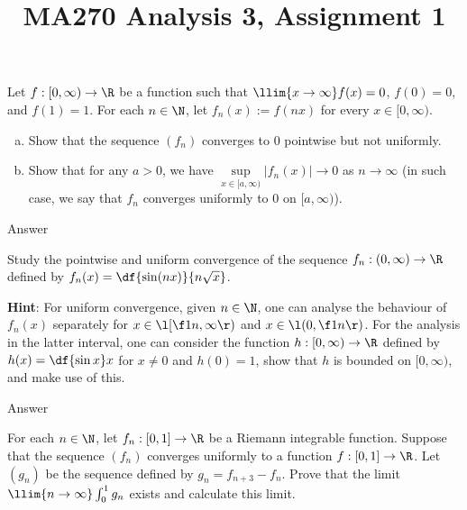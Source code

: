 \documentclass[a4paper]{article}
\title{MA270 Analysis 3, Assignment 1}
\begin{document}
\maketitle

\setlength{\parindent}{0em}
\setlength{\parskip}{1em}


\begin{questionbody}
Let $f : [0, \infty) \to \R$ be a function such that $\llim{x \to \infty} f(x) = 0$, $f(0) = 0$, and $f(1) = 1$. For each $n \in \N$, let $f_n(x) := f(nx)$ for every $x \in [0, \infty)$. %
\begin{enumerate}[(a)]
    \item Show that the sequence $(f_n)$ converges to 0 pointwise but not uniformly.
    \item Show that for any $a > 0$, we have $\sup\limits_{x \in [a, \infty)} |f_n(x)| \to 0$ as $n \to \infty$ (in such case, we say that $f_n$ converges uniformly to 0 on $[a, \infty)$). %
\end{enumerate}
\end{questionbody}

Answer



\begin{questionbody}
Study the pointwise and uniform convergence of the sequence $f_n : (0, \infty) \to \R$ defined by $f_n(x) = \df{\sin(nx)}{n \sqrt x}$.

\textbf{Hint}: For uniform convergence, given $n \in \N$, one can analyse the behaviour of $f_n(x)$ separately for $x \in \l[ \f1n, \infty \r)$ and $x \in \l( 0, \f1n \r)$. For the analysis in the latter interval, one can consider the function $h : [0, \infty) \to \R$ defined by $h(x) = \df{\sin x}x$ for $x \ne 0$ and $h(0) = 1$, show that $h$ is bounded on $[0, \infty)$, and make use of this. %
\end{questionbody}

Answer



\begin{questionbody}
For each $n \in \N$, let $f_n : [0, 1] \to \R$ be a Riemann integrable function. Suppose that the sequence $(f_n)$ converges uniformly to a function $f : [0, 1] \to \R$. Let $(g_n)$ be the sequence defined by $g_n = f_{n+3} - f_n$. Prove that the limit $\llim{n \to \infty} \int_0^1 g_n$ exists and calculate this limit.
\end{questionbody}
\end{document}
